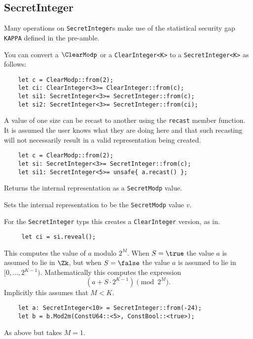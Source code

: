 \subsection{SecretInteger}
Many operations on \verb|SecretInteger|s make use of the statistical
security gap \verb|KAPPA| defined in the pre-amble.

You can convert a $\ClearModp$ or a \verb|ClearInteger<K>| to a
\verb|SecretInteger<K>|
as follows:
\begin{lstlisting}
    let c = ClearModp::from(2);
    let ci: ClearInteger<3>= ClearInteger::from(c);
    let si1: SecretInteger<3>= SecretInteger::from(c);
    let si2: SecretInteger<3>= SecretInteger::from(ci);
\end{lstlisting}

A value of one size can be recast to another using the \verb|recast|
member function. It is assumed the user knows what they are doing here
and that such recasting will not necessarily result in a valid representation
being created.
\begin{lstlisting}
    let c = ClearModp::from(2);
    let si: SecretInteger<3>= SecretInteger::from(c);
    let si1: SecretInteger<5>= unsafe{ a.recast() };
\end{lstlisting}

Returns the internal representation as a \verb|SecretModp| value.

Sets the internal representation to be the \verb|SecretModp| value $v$.

For the \verb|SecretInteger| typs this creates a \verb|ClearInteger| version, as in.
\begin{lstlisting}
     let ci = si.reveal();
\end{lstlisting}

This computes the value of $a$ modulo $2^M$.
When $S=\true$ the value $a$ is assumed to lie in $\Zk$,
but when $S=\false$ the value $a$ is assumed to lie in $[0,\ldots,2^{K-1})$.
Mathematically this computes the expression
\[  \left( a + S \cdot 2^{K-1} \right) \pmod 2^M. \]
Implicitly this assumes that $M < K$.
\begin{lstlisting}
    let a: SecretInteger<10> = SecretInteger::from(-24);
    let b = b.Mod2m(ConstU64::<5>, ConstBool::<true>);
\end{lstlisting}

As above but takes $M=1$.

